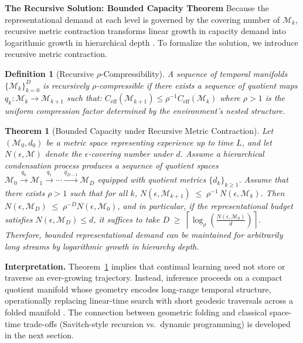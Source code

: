 \documentclass{article}
\newtheorem{theorem}{Theorem}
\newtheorem{definition}{Definition}
\begin{document}
 
\noindent\textbf{The Recursive Solution: Bounded Capacity Theorem}
Because the representational demand at each level is governed by the covering number of $\mathcal{M}_k$, recursive metric contraction transforms linear growth in capacity demand into logarithmic growth in hierarchical depth \cite{simon1973architecture}.
To formalize the solution, we introduce recursive metric contraction.
 
\begin{definition}[Recursive $\rho$-Compressibility]
\label{def:rho_compressibility}
A sequence of temporal manifolds $\{\mathcal{M}_k\}_{k=0}^D$ is \emph{recursively $\rho$-compressible} if there exists a sequence of quotient maps $q_k: \mathcal{M}_k \to \mathcal{M}_{k+1}$ such that:
    $C_{\mathrm{eff}}(\mathcal{M}_{k+1}) \le \rho^{-1} C_{\mathrm{eff}}(\mathcal{M}_k)$
where $\rho > 1$ is the uniform compression factor determined by the environment's nested structure.
\end{definition}
\begin{theorem}[Bounded Capacity under Recursive Metric Contraction]
\label{thm:bounded_capacity}
Let $(\mathcal M_0, d_0)$ be a metric space representing experience up to time $L$,
and let $N(\epsilon,\mathcal M)$ denote the $\epsilon$-covering number under $d$.
Assume a hierarchical condensation process produces a sequence of quotient spaces
$\mathcal{M}_0 \xrightarrow{q_0} \mathcal{M}_1 \xrightarrow{q_1} \cdots \xrightarrow{q_{D-1}} \mathcal{M}_D$
equipped with quotient metrics $\{d_k\}_{k\ge 1}$.
Assume that there exists $\rho>1$ such that for all $k$,
$N(\epsilon,\mathcal M_{k+1}) \;\le\; \rho^{-1}\, N(\epsilon,\mathcal M_k)$.
Then
$N(\epsilon,\mathcal M_D) \;\le\; \rho^{-D} N(\epsilon,\mathcal M_0)$,
and in particular, if the representational budget satisfies $N(\epsilon,\mathcal M_D)\le d$,
it suffices to take
$D \;\ge\; \left\lceil \log_{\rho}\!\left(\frac{N(\epsilon,\mathcal M_0)}{d}\right)\right\rceil$.
Therefore, bounded representational demand can be maintained for arbitrarily long streams
by logarithmic growth in hierarchy depth.
\end{theorem}
 
\noindent\textbf{Interpretation.}
Theorem~\ref{thm:bounded_capacity} implies that continual learning need not store or traverse an ever-growing trajectory. Instead, inference proceeds on a compact quotient manifold whose geometry encodes long-range temporal structure, operationally replacing linear-time search with short geodesic traversals across a folded manifold \cite{burago2001course}. The connection between geometric folding and classical space-time trade-offs (Savitch-style recursion vs.\ dynamic programming) is developed in the next section.
 
\end{document}
